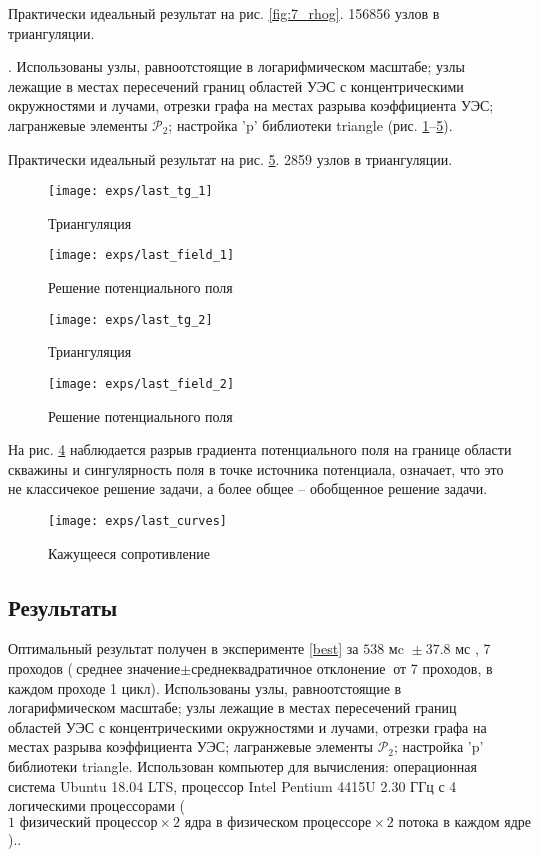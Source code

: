 Практически идеальный результат на рис. \ref{fig:7_rhog}. 156856 узлов в триангуляции.


 \theexp \label{best}.
Использованы узлы, равноотстоящие в логарифмическом масштабе;
узлы лежащие в местах пересечений границ областей УЭС с концентрическими окружностями и лучами,
отрезки графа на местах разрыва коэффициента УЭС; лагранжевые элементы ${\mathcal{P}_2}$; настройка 'p' библиотеки triangle
(рис. \ref{fig:8_mesh_1}--\ref{fig:8_rhog}).

Практически идеальный результат на рис. \ref{fig:8_rhog}. 2859 узлов в триангуляции.

\begin{figure}[H]
\texttt{[image: exps/last\_tg\_1]}
\caption{Триангуляция}
\label{fig:8_mesh_1}
\end{figure}

\begin{figure}[H]
\texttt{[image: exps/last\_field\_1]}
\caption{Решение потенциального поля}
\label{fig:8_field_1}
\end{figure}

\begin{figure}[H]
\texttt{[image: exps/last\_tg\_2]}
\caption{Триангуляция}
\label{fig:8_mesh_2}
\end{figure}

\begin{figure}[H]
\texttt{[image: exps/last\_field\_2]}
\caption{Решение потенциального поля}
\label{fig:8_field_2}
\end{figure}

На рис. \ref{fig:8_field_2} наблюдается разрыв градиента потенциального поля на границе области скважины
и сингулярность поля в точке источника потенциала,
означает, что это не классичекое решение задачи, а более общее -- обобщенное решение задачи. 

\begin{figure}[H]
\texttt{[image: exps/last\_curves]}
\caption{Кажущееся сопротивление}
\label{fig:8_rhog}
\end{figure}


\subsection{Результаты}

Оптимальный результат получен в эксперименте \ref{best} за ${538 \text{ мc } \pm 37.8 \text{ мс }}$, 7 проходов
(${\text{среднее значение} \pm \text{среднеквадратичное отклонение}}$ от 7 проходов, в каждом проходе 1 цикл). Использованы узлы, равноотстоящие в логарифмическом масштабе; узлы лежащие в местах пересечений границ областей УЭС с концентрическими окружностями и лучами, отрезки графа на местах разрыва коэффициента УЭС; лагранжевые элементы ${\mathcal{P}_2}$; настройка 'p' библиотеки triangle. Использован компьютер для вычисления: операционная система Ubuntu 18.04 LTS, процессор Intel Pentium 4415U 2.30 ГГц с 4 логическими процессорами ($1 \text{ физический процессор} \times 2 \text{ ядра в физическом процессоре} \times 2 \text{ потока в каждом ядре}$)..

